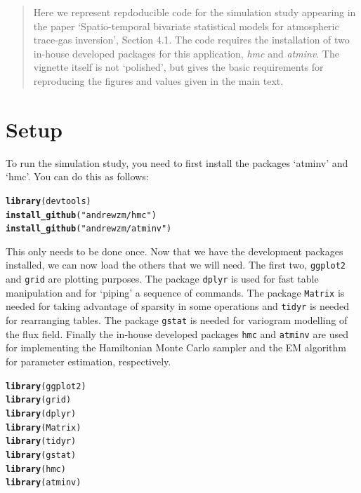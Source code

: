 \documentclass[a4paper,11pt]{article}\usepackage[]{graphicx}\usepackage[]{color}
\makeatletter
\newcommand{\hlstr}[1]{\textcolor[rgb]{0.192,0.494,0.8}{#1}}%
\newcommand{\hlstd}[1]{\textcolor[rgb]{0.345,0.345,0.345}{#1}}%
\newcommand{\hlkwd}[1]{\textcolor[rgb]{0.737,0.353,0.396}{\textbf{#1}}}%
\newenvironment{kframe}{%
 \def\at@end@of@kframe{}%
 \ifinner\ifhmode%
  \def\at@end@of@kframe{\end{minipage}}%
  \begin{minipage}{\columnwidth}%
 \fi\fi%
 \def\FrameCommand##1{\hskip\@totalleftmargin \hskip-\fboxsep
 \colorbox{shadecolor}{##1}\hskip-\fboxsep
     \hskip-\linewidth \hskip-\@totalleftmargin \hskip\columnwidth}%
 \MakeFramed {\advance\hsize-\width
   \@totalleftmargin\z@ \linewidth\hsize
   \@setminipage}}%
 {\par\unskip\endMakeFramed%
 \at@end@of@kframe}
\newenvironment{knitrout}{}{} %
\makeatother
\begin{document}
\begin{abstract}
Here we represent repdoducible code for the simulation study appearing in the paper `Spatio-temporal bivariate statistical models for atmospheric trace-gas inversion', Section 4.1. The code requires the installation of two in-house developed packages for this application, \emph{hmc} and \emph{atminv}. The vignette itself is not `polished', but gives the basic requirements for reproducing the figures and values given in the main text.

\end{abstract}

\section{Setup}

To run the simulation study, you need to first install the packages `atminv' and `hmc'. You can do this as follows:

\begin{knitrout}
\color{fgcolor}\begin{kframe}
\begin{alltt}
\hlkwd{library}\hlstd{(devtools)}
\hlkwd{install_github}\hlstd{(}\hlstr{"andrewzm/hmc"}\hlstd{)}
\hlkwd{install_github}\hlstd{(}\hlstr{"andrewzm/atminv"}\hlstd{)}
\end{alltt}
\end{kframe}
\end{knitrout}

This only needs to be done once. Now that we have the development packages installed, we can now load the others that we will need. The first two, \texttt{ggplot2} and \texttt{grid} are plotting purposes. The package \texttt{dplyr} is used for fast table manipulation and for `piping' a sequence of commands. The package \texttt{Matrix} is needed for taking advantage of sparsity in some operations and \texttt{tidyr} is needed for rearranging tables. The package \texttt{gstat} is needed for variogram modelling of the flux field. Finally the in-house developed packages \texttt{hmc} and \texttt{atminv} are used for implementing the Hamiltonian Monte Carlo sampler and the EM algorithm for parameter estimation, respectively.

\begin{knitrout}
\color{fgcolor}\begin{kframe}
\begin{alltt}
\hlkwd{library}\hlstd{(ggplot2)}
\hlkwd{library}\hlstd{(grid)}
\hlkwd{library}\hlstd{(dplyr)}
\hlkwd{library}\hlstd{(Matrix)}
\hlkwd{library}\hlstd{(tidyr)}
\hlkwd{library}\hlstd{(gstat)}
\hlkwd{library}\hlstd{(hmc)}
\hlkwd{library}\hlstd{(atminv)}
\end{alltt}
\end{kframe}
\end{knitrout}
\end{document}

